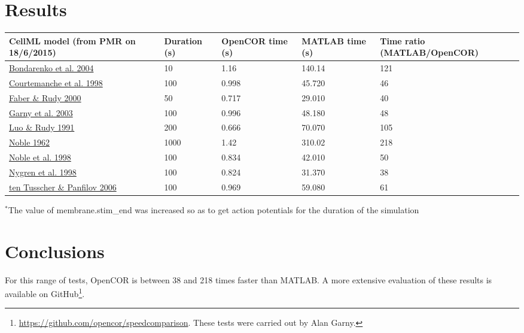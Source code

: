 \documentclass[a4paper,10pt,english]{sphinxmanual}
\begin{document}
\section{Results}
\label{speed_comp:results}
\begin{tabulary}{\linewidth}{|L|L|L|L|L|}
\hline
\textsf{\relax 
\textbf{CellML model}  (from PMR on 18/6/2015)
} & \textsf{\relax 
\textbf{Duration} (s)
} & \textsf{\relax 
\textbf{OpenCOR time} (s)
} & \textsf{\relax 
\textbf{MATLAB time} (s)
} & \textsf{\relax 
\textbf{Time ratio}
(MATLAB/OpenCOR)
}\\
\hline
\href{http://models.cellml.org/e/41}{Bondarenko et al. 2004}
 & 
10
 & 
1.16
 & 
140.14
 & 
121
\\
\hline
\href{http://models.cellml.org/exposure/0e03bbe01606be5811691f9d5de10b65}{Courtemanche et al. 1998}
 & 
100
 & 
0.998
 & 
45.720
 & 
46
\\
\hline
\href{http://models.cellml.org/exposure/55643f2114a2a463ada007deb9fc3913}{Faber \& Rudy 2000}
 & 
50
 & 
0.717
 & 
29.010
 & 
40
\\
\hline
\href{http://models.cellml.org/exposure/d71105df45dd7030b3c99b2b1e95b8c0}{Garny et al. 2003}
 & 
100
 & 
0.996
 & 
48.180
 & 
48
\\
\hline
\href{http://models.cellml.org/exposure/2d2ce7737b42a4f72d6bf8b67f6eb5a2}{Luo \& Rudy 1991}
 & 
200
 & 
0.666
 & 
70.070
 & 
105
\\
\hline
\href{http://models.cellml.org/exposure/812eeafbc8ebe97bef435340c80cfcce}{Noble 1962}
 & 
1000
 & 
1.42
 & 
310.02
 & 
218
\\
\hline
\href{http://models.cellml.org/exposure/a40c4434423c0436e2789a2d457b7ab2}{Noble et al. 1998}
 & 
100
 & 
0.834
 & 
42.010
 & 
50
\\
\hline
\href{http://models.cellml.org/exposure/ad761ce160f3b4077bbae7a004c229e3}{Nygren et al. 1998}
 & 
100
 & 
0.824
 & 
31.370
 & 
38
\\
\hline
\href{http://models.cellml.org/exposure/a7179d94365ff0c9c0e6eb7c6a787d3d}{ten Tusscher \& Panfilov 2006}
 & 
100
 & 
0.969
 & 
59.080
 & 
61
\\
\hline\end{tabulary}


$^{\text{*}}$The value of membrane.stim\_end was increased so as to get
action potentials for the duration of the simulation


\section{Conclusions}
\label{speed_comp:conclusions}
For this range of tests, OpenCOR is between 38 and 218 times faster than MATLAB.
A more extensive evaluation of these results is available on GitHub\footnote[2]{
\href{https://github.com/opencor/speedcomparison}{https://github.com/opencor/speedcomparison}. These tests were carried out by Alan Garny.
}.
\end{document}
